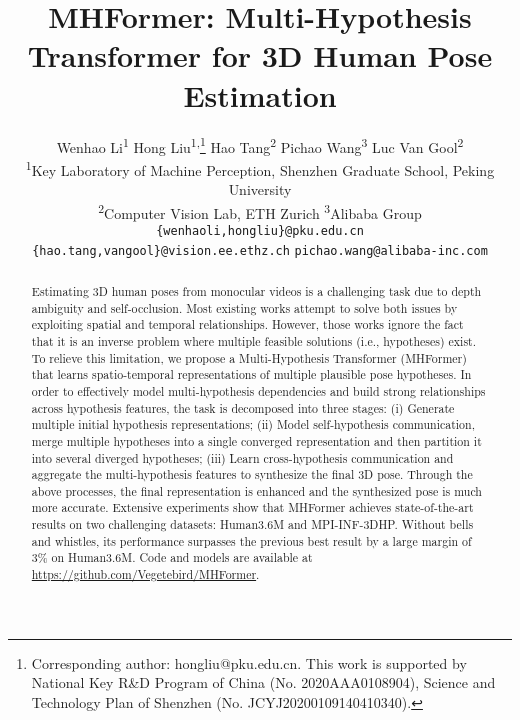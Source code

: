 \documentclass[10pt,twocolumn,letterpaper]{article}
\begin{document}
\title{MHFormer: Multi-Hypothesis Transformer for 3D Human Pose Estimation}

\author{
  Wenhao Li\textsuperscript{1} \quad
  Hong Liu\textsuperscript{1,}\thanks{Corresponding author: hongliu@pku.edu.cn. 
  This work is supported by National Key R\&D Program of China (No. 2020AAA0108904), Science and Technology Plan of Shenzhen (No. JCYJ20200109140410340).} \quad 
  Hao Tang\textsuperscript{2} \quad 
  Pichao Wang\textsuperscript{3} \quad 
  Luc Van Gool\textsuperscript{2} \\
  \textsuperscript{1}Key Laboratory of Machine Perception, Shenzhen Graduate School, Peking University \\
  \textsuperscript{2}Computer Vision Lab, ETH Zurich \quad
  \textsuperscript{3}Alibaba Group \\
  {\tt\small \{wenhaoli,hongliu\}@pku.edu.cn} \quad \\ {\tt\small\{hao.tang,vangool\}@vision.ee.ethz.ch} \quad 
  {\tt\small pichao.wang@alibaba-inc.com}
}

\maketitle
  
\begin{abstract}
Estimating 3D human poses from monocular videos is a challenging task due to depth ambiguity and self-occlusion. Most existing works attempt to solve both issues by exploiting spatial and temporal relationships. However, those works ignore the fact that it is an inverse problem where multiple feasible solutions (i.e., hypotheses) exist. To relieve this limitation, we propose a Multi-Hypothesis Transformer (MHFormer) that learns spatio-temporal representations of multiple plausible pose hypotheses. In order to effectively model multi-hypothesis dependencies and build strong relationships across hypothesis features, the task is decomposed into three stages: (i) Generate multiple initial hypothesis representations; (ii) Model self-hypothesis communication, merge multiple hypotheses into a single converged representation and then partition it into several diverged hypotheses; (iii) Learn cross-hypothesis communication and aggregate the multi-hypothesis features to synthesize the final 3D pose. Through the above processes, the final representation is enhanced and the synthesized pose is much more accurate. Extensive experiments show that MHFormer achieves state-of-the-art results on two challenging datasets: Human3.6M and MPI-INF-3DHP. Without bells and whistles, its performance surpasses the previous best result by a large margin of 3\% on Human3.6M. Code and models are available at \url{https://github.com/Vegetebird/MHFormer}. 
\end{abstract}
  
\end{document}
